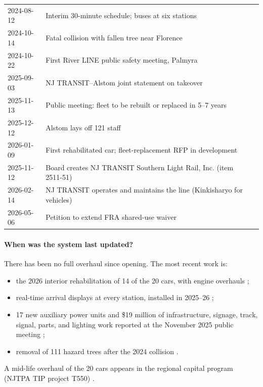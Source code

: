 \documentclass[11pt]{article}
\begin{document}
{\begin{longtable}{@{}p{2.1cm}p{9.6cm}p{2.9cm}@{}}
2024-08-12 & Interim 30-minute schedule; buses at six stations & \citep{njt2024interim} \\
2024-10-14 & Fatal collision with fallen tree near Florence & \citep{ntsb2025} \\
2024-10-22 & First River LINE public safety meeting, Palmyra & \citep{cbs2024meeting} \\
2025-09-03 & NJ TRANSIT--Alstom joint statement on takeover & \citep{njt2025alstom} \\
2025-11-13 & Public meeting: fleet to be rebuilt or replaced in 5--7 years & \citep{centraljersey2025} \\
2025-12-12 & Alstom lays off 121 staff & \citep{patch2025layoffs} \\
2026-01-09 & First rehabilitated car; fleet-replacement RFP in development & \citep{njt2026rehab} \\
2025-11-12 & Board creates NJ TRANSIT Southern Light Rail, Inc. (item 2511-51) & \citep{njt2025board} \\
2026-02-14 & NJ TRANSIT operates and maintains the line (Kinkisharyo for vehicles) & \citep{ols2027njt,njt2025board} \\
2026-05-06 & Petition to extend FRA shared-use waiver & \citep{fr2026waiver} \\
\bottomrule
\end{longtable}}

\paragraph{When was the system last updated?} There has been no full overhaul since opening. The most recent work is:
\begin{itemize}
\item the 2026 interior rehabilitation of 14 of the 20 cars, with engine overhauls \citep{njt2026rehab};
\item real-time arrival displays at every station, installed in 2025--26 \citep{njt2026rehab};
\item 17 new auxiliary power units and \$19 million of infrastructure, signage, track, signal, parts, and lighting work reported at the November 2025 public meeting \citep{centraljersey2025};
\item removal of 111 hazard trees after the 2024 collision \citep{ntsb2025}.
\end{itemize}
A mid-life overhaul of the 20 cars appears in the regional capital program (NJTPA TIP project T550) \citep{njtpa_tip}.
\end{document}
